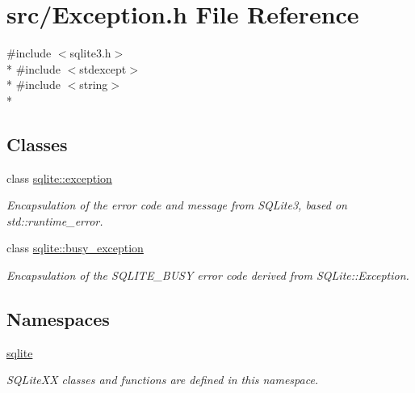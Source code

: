 \hypertarget{a00024}{\section{src/\-Exception.h File Reference}
\label{a00024}
}
{\ttfamily \#include $<$sqlite3.\-h$>$}\\*
{\ttfamily \#include $<$stdexcept$>$}\\*
{\ttfamily \#include $<$string$>$}\\*
\subsection*{Classes}
\begin{DoxyCompactItemize}
\item 
class \hyperlink{a00006}{sqlite\-::exception}
\begin{DoxyCompactList}\small\item\em Encapsulation of the error code and message from S\-Q\-Lite3, based on std\-::runtime\-\_\-error. \end{DoxyCompactList}\item 
class \hyperlink{a00003}{sqlite\-::busy\-\_\-exception}
\begin{DoxyCompactList}\small\item\em Encapsulation of the S\-Q\-L\-I\-T\-E\-\_\-\-B\-U\-S\-Y error code derived from S\-Q\-Lite\-::\-Exception. \end{DoxyCompactList}\end{DoxyCompactItemize}
\subsection*{Namespaces}
\begin{DoxyCompactItemize}
\item 
\hyperlink{a00038}{sqlite}
\begin{DoxyCompactList}\small\item\em S\-Q\-Lite\-X\-X classes and functions are defined in this namespace. \end{DoxyCompactList}\end{DoxyCompactItemize}
